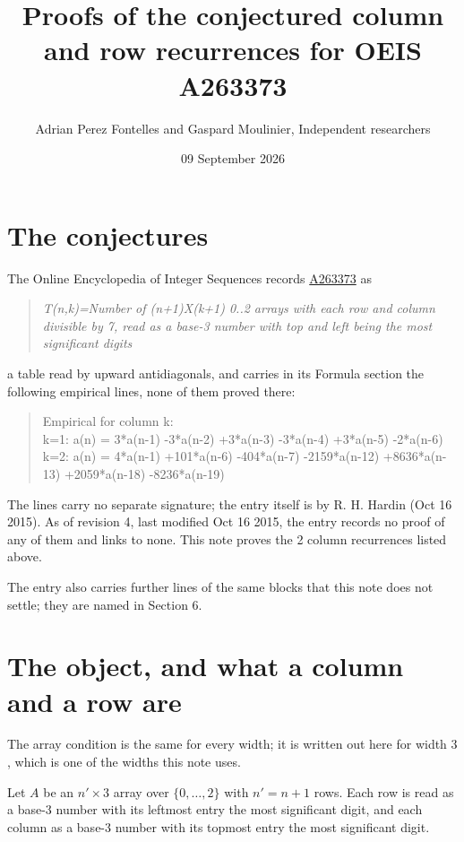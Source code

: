 \documentclass[11pt]{article}
\title{Proofs of the conjectured column and row recurrences for OEIS A263373}
\author{Adrian Perez Fontelles and Gaspard Moulinier, Independent researchers}
\date{09 September 2026}
\theoremstyle{definition}
\begin{document}
\maketitle
\section{The conjectures}

The Online Encyclopedia of Integer Sequences records \href{https://oeis.org/A263373}{A263373} as

\begin{quote}\itshape T(n,k)=Number of (n+1)X(k+1) 0..2 arrays with each row and column divisible by 7, read as a base-3 number with top and left being the most significant digits\end{quote}

a table read by upward antidiagonals, and carries in its Formula section the following empirical lines, none of them proved there:

\begin{quote}\ttfamily Empirical for column k:\\
k=1: a(n) = 3*a(n-1) -3*a(n-2) +3*a(n-3) -3*a(n-4) +3*a(n-5) -2*a(n-6)\\k=2: a(n) = 4*a(n-1) +101*a(n-6) -404*a(n-7) -2159*a(n-12) +8636*a(n-13) +2059*a(n-18) -8236*a(n-19)\end{quote}

The lines carry no separate signature; the entry itself is by R. H. Hardin (Oct 16 2015). As of revision 4, last modified Oct 16 2015, the entry records no proof of any of them and links to none. This note proves the 2 column recurrences listed above.

The entry also carries further lines of the same blocks that this note does not settle; they are named in Section 6.

\section{The object, and what a column and a row are}

The array condition is the same for every width; it is written out here for width $3$, which is one of the widths this note uses.

Let $A$ be an $n' \times 3$ array over $\{0,\dots,2\}$ with $n' = n + 1$ rows. Each row is read as a base-$3$ number with its leftmost entry the most significant digit, and each column as a base-$3$ number with its topmost entry the most significant digit.
\end{document}
